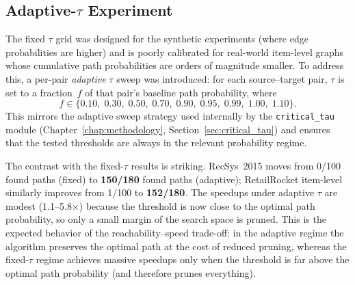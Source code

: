 \subsection{Adaptive-\texorpdfstring{$\tau$}{tau} Experiment}\label{sec:adaptive_tau}

The fixed $\tau$ grid was designed for the synthetic experiments (where edge probabilities are higher) and is poorly calibrated for real-world item-level graphs whose cumulative path probabilities are orders of magnitude smaller. To address this, a per-pair \emph{adaptive} $\tau$ sweep was introduced: for each source--target pair, $\tau$ is set to a fraction~$f$ of that pair's baseline path probability, where
\[
  f \in \{0.10,\; 0.30,\; 0.50,\; 0.70,\; 0.90,\; 0.95,\; 0.99,\; 1.00,\; 1.10\}.
\]
This mirrors the adaptive sweep strategy used internally by the \texttt{critical\_tau} module (Chapter~\ref{chap:methodology}, Section~\ref{sec:critical_tau}) and ensures that the tested thresholds are always in the relevant probability regime.

\begin{table}[htbp]
\centering
\renewcommand{\arraystretch}{1.3}
\caption[Adaptive-$\tau$ real-data speedup]{Adaptive-$\tau$ speedup results.}
\label{table:real_data_adaptive}
\end{table}

The contrast with the fixed-$\tau$ results is striking. RecSys~2015 moves from 0/100 found paths (fixed) to \textbf{150/180} found paths (adaptive); RetailRocket item-level similarly improves from 1/100 to \textbf{152/180}. The speedups under adaptive $\tau$ are modest (1.1--5.8$\times$) because the threshold is now close to the optimal path probability, so only a small margin of the search space is pruned. This is the expected behavior of the reachability--speed trade-off: in the adaptive regime the algorithm preserves the optimal path at the cost of reduced pruning, whereas the fixed-$\tau$ regime achieves massive speedups only when the threshold is far above the optimal path probability (and therefore prunes everything).

